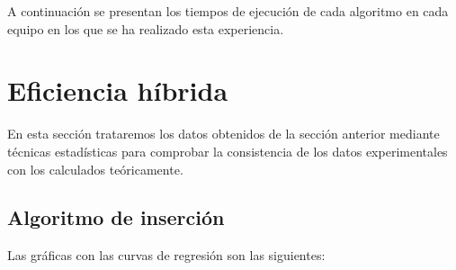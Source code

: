 \documentclass{homework}
\begin{document}
    A continuación se presentan los tiempos de ejecución de cada algoritmo en cada equipo en los que se ha realizado
    esta experiencia. 

    \section{Eficiencia híbrida}
    
    En esta sección trataremos los datos obtenidos de la sección anterior mediante técnicas estadísticas para
    comprobar la consistencia de los datos experimentales con los calculados teóricamente. 

    \subsection{Algoritmo de inserción}

    Las gráficas con las curvas de regresión son las siguientes:
\end{document}
